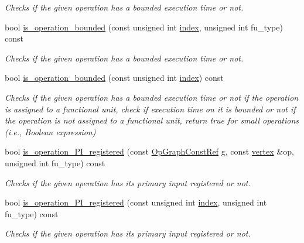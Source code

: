 \begin{DoxyCompactItemize}
\begin{DoxyCompactList}\small\item\em Checks if the given operation has a bounded execution time or not. \end{DoxyCompactList}\item 
bool \hyperlink{classAllocationInformation_a3cd743252fc29a899a2079e03792515b}{is\+\_\+operation\+\_\+bounded} (const unsigned int \hyperlink{tutorial__pact__2019_2Introduction_2third_2include_2Keccak_8h_a028c9bdc8344cca38ab522a337074797}{index}, unsigned int fu\+\_\+type) const
\begin{DoxyCompactList}\small\item\em Checks if the given operation has a bounded execution time or not. \end{DoxyCompactList}\item 
bool \hyperlink{classAllocationInformation_a852be192e7a71d94c235d38dfc3dd96d}{is\+\_\+operation\+\_\+bounded} (const unsigned int \hyperlink{tutorial__pact__2019_2Introduction_2third_2include_2Keccak_8h_a028c9bdc8344cca38ab522a337074797}{index}) const
\begin{DoxyCompactList}\small\item\em Checks if the given operation has a bounded execution time or not if the operation is assigned to a functional unit, check if execution time on it is bounded or not if the operation is not assigned to a functional unit, return true for small operations (i.\+e., Boolean expression) \end{DoxyCompactList}\item 
bool \hyperlink{classAllocationInformation_a669fe3fcd55c57ac188cb0651a4117c0}{is\+\_\+operation\+\_\+\+P\+I\+\_\+registered} (const \hyperlink{op__graph_8hpp_a9a0b240622c47584bee6951a6f5de746}{Op\+Graph\+Const\+Ref} g, const \hyperlink{graph_8hpp_abefdcf0544e601805af44eca032cca14}{vertex} \&op, unsigned int fu\+\_\+type) const
\begin{DoxyCompactList}\small\item\em Checks if the given operation has its primary input registered or not. \end{DoxyCompactList}\item 
bool \hyperlink{classAllocationInformation_a2e448da646b4b29ad72f75c75fdf04b2}{is\+\_\+operation\+\_\+\+P\+I\+\_\+registered} (const unsigned int \hyperlink{tutorial__pact__2019_2Introduction_2third_2include_2Keccak_8h_a028c9bdc8344cca38ab522a337074797}{index}, unsigned int fu\+\_\+type) const
\begin{DoxyCompactList}\small\item\em Checks if the given operation has its primary input registered or not. \end{DoxyCompactList}\item 

\end{DoxyCompactItemize}
